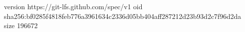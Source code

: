 version https://git-lfs.github.com/spec/v1
oid sha256:bf0285f4818feb776a3961634c2336d05bb404aff287212d23b93d2c7f96d2da
size 196672
